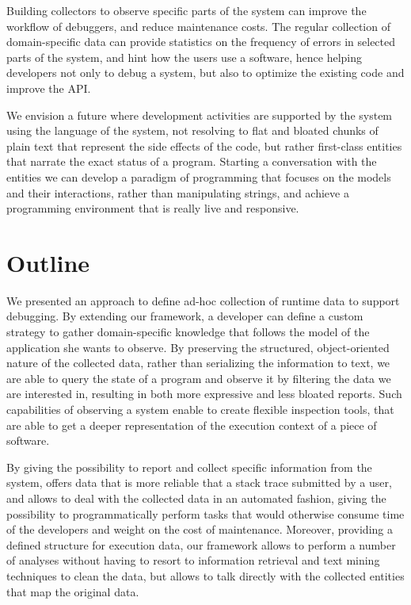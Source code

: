 Building collectors to observe specific parts of the system can improve the workflow of debuggers, and reduce maintenance costs.
The regular collection of domain-specific data can provide statistics on the frequency of errors in selected parts of the system, and hint how the users use a software, hence helping developers not only to debug a system, but also to optimize the existing code and improve the API.

We envision a future where development activities are supported by the system using the language of the system, not resolving to flat and bloated chunks of plain text that represent the side effects of the code, but rather first-class entities that narrate the exact status of a program.
Starting a conversation with the entities we can develop a paradigm of programming that focuses on the models and their interactions, rather than manipulating strings, and achieve a programming environment that is really live and responsive.


\section{Outline}\label{sec:reified-summary}

We presented an approach to define ad-hoc collection of runtime data to support debugging.
By extending our framework, a developer can define a custom strategy to gather domain-specific knowledge that follows the model of the application she wants to observe.
By preserving the structured, object-oriented nature of the collected data, rather than serializing the information to text, we are able to query the state of a program  and observe it by filtering the data we are interested in, resulting in both more expressive and less bloated reports.
Such capabilities of observing a system enable to create flexible inspection tools, that are able to get a deeper representation of the execution context of a piece of software.

By giving the possibility to report and collect specific information from the system, \sln offers data that is more reliable that a stack trace submitted by a user, and allows to deal with the collected data in an automated fashion, giving the possibility to programmatically perform tasks that would otherwise consume time of the developers and weight on the cost of maintenance.
Moreover, providing a defined structure for execution data, our framework allows to perform a number of analyses without having to resort to information retrieval and text mining techniques to clean the data, but allows to talk directly with the collected entities that map the original data.

